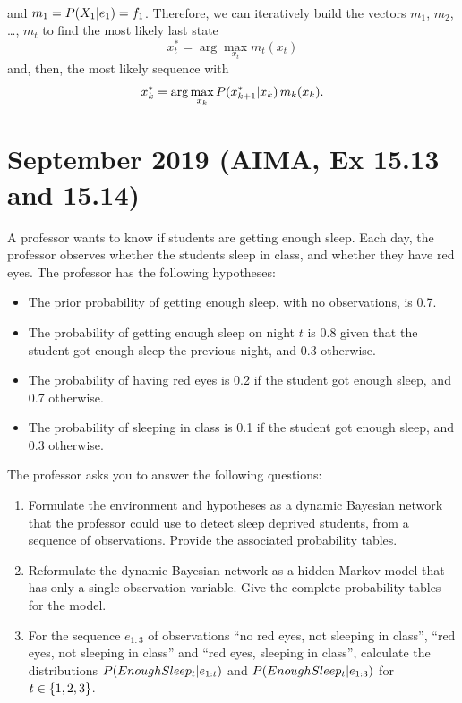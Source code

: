 \documentclass[11pt, a4paper]{article}
\begin{document}
\begin{enumerate}
\begin{solution}
\begin{align*}
        \end{align*}
        and $m_1 = P(X_1 \vert e_1) = f_1$. Therefore, we can iteratively build the vectors $m_1$, $m_2$, \dots, $m_t$ to find the most likely last state
        \begin{equation*}
            x_t^* = \arg \max_{x_t} m_t(x_t)
        \end{equation*}
        and, then, the most likely sequence with
        \begin{equation*}
            x_k^* = \arg \max_{x_k} P(x^*_{k + 1} \vert x_k) \, m_k(x_k) .
        \end{equation*}
    \end{solution}

\end{enumerate}

\newpage

\section{September 2019 (AIMA, Ex 15.13 and 15.14)}

A professor wants to know if students are getting enough sleep. Each day, the professor observes whether the students sleep in class, and whether they have red eyes. The professor has the following hypotheses:
\begin{itemize}
    \item The prior probability of getting enough sleep, with no observations, is \num{0.7}.
    \item The probability of getting enough sleep on night $t$ is \num{0.8} given that the student got enough sleep the previous night, and \num{0.3} otherwise.
    \item The probability of having red eyes is \num{0.2} if the student got enough sleep, and \num{0.7} otherwise.
    \item The probability of sleeping in class is \num{0.1} if the student got enough sleep, and \num{0.3} otherwise.
\end{itemize}
The professor asks you to answer the following questions:

\begin{enumerate}
    \item Formulate the environment and hypotheses as a dynamic Bayesian network that the professor could use to detect sleep deprived students, from a sequence of observations. Provide the associated probability tables.

    \item Reformulate the dynamic Bayesian network as a hidden Markov model that has only a single observation variable. Give the complete probability tables for the model.

    \item For the sequence $e_{1:3}$ of observations \enquote{no red eyes, not sleeping in class}, \enquote{red eyes, not sleeping in class} and
    \enquote{red eyes, sleeping in class}, calculate the distributions $P(EnoughSleep_t \vert e_{1:t})$ and $P(EnoughSleep_t \vert e_{1:3})$ for $t \in \{1, 2, 3\}$.
\end{enumerate}
\end{document}

